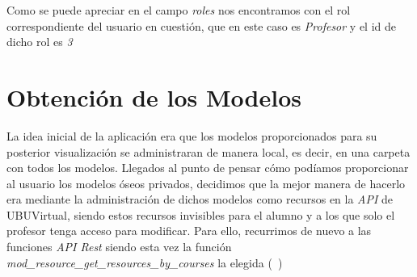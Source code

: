 Como se puede apreciar en el campo \textit{roles} nos encontramos con el rol correspondiente del usuario en cuestión, que en este caso es \textit{Profesor} y el id de dicho rol es \textit{3}

\section{Obtención de los Modelos}
La idea inicial de la aplicación era que los modelos proporcionados para su posterior visualización se administraran de manera local, es decir, en una carpeta con todos los modelos. Llegados al punto de pensar cómo podíamos proporcionar al usuario los modelos óseos privados, decidimos que la mejor manera de hacerlo era mediante la administración de dichos modelos como recursos en la \textit{API} de UBUVirtual, siendo estos recursos invisibles para el alumno y a los que solo el profesor tenga acceso para modificar. Para ello, recurrimos de nuevo a las funciones \textit{API Rest} siendo esta vez la función \textit{mod_resource_get_resources_by_courses} la elegida (~\cite{moodle:web-service-api-functions})